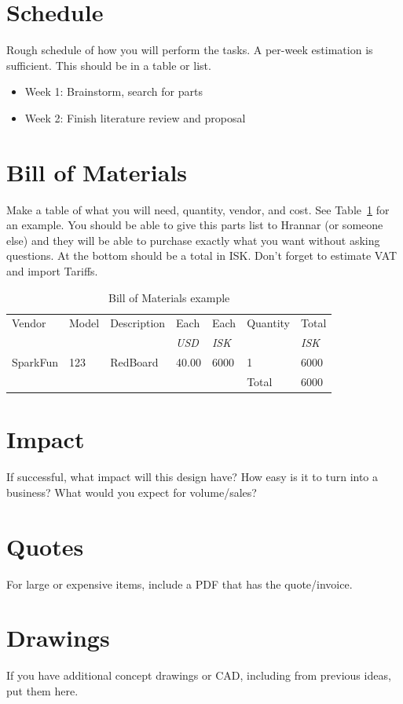 \documentclass[draft]{ipfwreport}
\begin{document}
\section{Schedule}
Rough schedule of how you will perform the tasks.
A per-week estimation is sufficient.
This should be in a table or list.

\begin{itemize}
\item Week 1: Brainstorm, search for parts
\item Week 2: Finish literature review and proposal
  \end{itemize}

\section{Bill of Materials}
Make a table of what you will need, quantity, vendor, and cost.
See Table~\ref{tab:bom} for an example.
You should be able to give this parts list to Hrannar (or someone else) and they will be able to purchase exactly what you want without asking questions.
At the bottom should be a total in ISK.\@
Don't forget to estimate VAT and import Tariffs.


\begin{table}
  \centering
  \caption{Bill of Materials example}\label{tab:bom}
  \begin{tabular}{lllllll}\toprule
    Vendor &Model &Description &Each &Each &Quantity &Total\\
           &      &            &{\it USD} &{\it ISK}  &         &{\it ISK}  \\\midrule
    SparkFun &123 &RedBoard &40.00 &6000 &1 &6000\\
    \midrule
    & & & & &Total &6000\\
                                              
  \end{tabular}
\end{table}

\section{Impact}
If successful, what impact will this design have?
How easy is it to turn into a business?
What would you expect for volume/sales?




\newpage
\appendix
\section{Quotes}
For large or expensive items, include a PDF that has the quote/invoice.

\section{Drawings}
If you have additional concept drawings or CAD, including from previous ideas, put them here.
\end{document}

